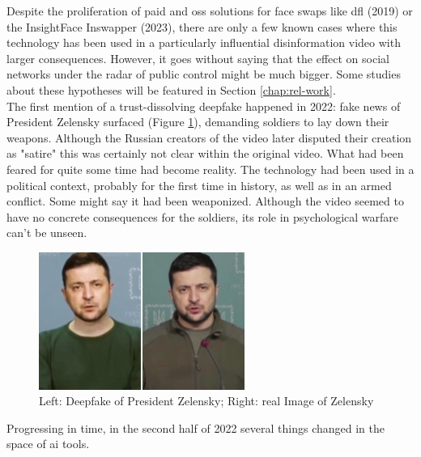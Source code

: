 \documentclass[
  a4paper,  %
  twoside,  %
  bibliography=totoc,
  headsepline,
  cleardoublepage=empty,
  parskip=half,
  draft=false
]{scrbook}
\begin{document}
Despite the proliferation of paid and \gls{oss} solutions for face swaps like \gls{dfl} (2019) or the InsightFace Inswapper (2023), there are only a few known cases where this technology has been used in a particularly influential disinformation video with larger consequences. However, it goes without saying that the effect on social networks under the radar of public control might be much bigger. Some studies about these hypotheses will be featured in Section \ref{chap:rel-work}. \\
The first mention of a trust-dissolving deepfake happened in 2022: fake news of President Zelensky surfaced (Figure \ref{fig:zelensky-Deepfake}), demanding soldiers to lay down their weapons. Although the Russian creators of the video later disputed their creation as "satire" this was certainly not clear within the original video. What had been feared for quite some time had become reality. The technology had been used in a political context, probably for the first time in history, as well as in an armed conflict. Some might say it had been weaponized. Although the video seemed to have no concrete consequences for the soldiers, its role in psychological warfare can't be unseen.
\begin{figure}[h]
  \centering
  \includegraphics[width=0.6\textwidth]{./graphics/Zelensky.jpg}
  \caption{Left: Deepfake of President Zelensky; Right: real Image of Zelensky \cite{universityofvirginiaZelenskyySurrenderHoax2022}}
  \label{fig:zelensky-Deepfake}
\end{figure}
Progressing in time, in the second half of 2022 several things changed in the space of \gls{ai} tools.
\end{document}
